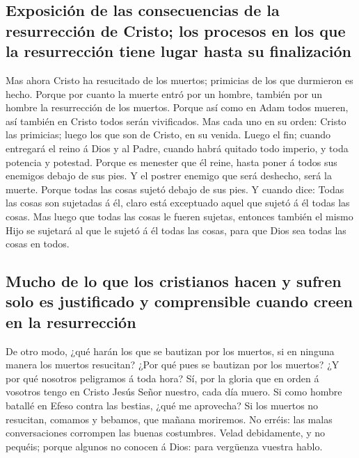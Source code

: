 \hypertarget{exposiciuxf3n-de-las-consecuencias-de-la-resurrecciuxf3n-de-cristo-los-procesos-en-los-que-la-resurrecciuxf3n-tiene-lugar-hasta-su-finalizaciuxf3n}{%
\subsection{Exposición de las consecuencias de la resurrección de
Cristo; los procesos en los que la resurrección tiene lugar hasta su
finalización}\label{exposiciuxf3n-de-las-consecuencias-de-la-resurrecciuxf3n-de-cristo-los-procesos-en-los-que-la-resurrecciuxf3n-tiene-lugar-hasta-su-finalizaciuxf3n}}

 Mas ahora Cristo ha resucitado de los muertos; primicias
de los que durmieron es hecho.  Porque por cuanto la
muerte entró por un hombre, también por un hombre la resurrección de los
muertos.  Porque así como en Adam todos mueren, así
también en Cristo todos serán vivificados.  Mas cada uno
en su orden: Cristo las primicias; luego los que son de Cristo, en su
venida.  Luego el fin; cuando entregará el reino á Dios y
al Padre, cuando habrá quitado todo imperio, y toda potencia y potestad.
 Porque es menester que él reine, hasta poner á todos sus
enemigos debajo de sus pies.  Y el postrer enemigo que
será deshecho, será la muerte.  Porque todas las cosas
sujetó debajo de sus pies. Y cuando dice: Todas las cosas son sujetadas
á él, claro está exceptuado aquel que sujetó á él todas las cosas.
 Mas luego que todas las cosas le fueren sujetas,
entonces también el mismo Hijo se sujetará al que le sujetó á él todas
las cosas, para que Dios sea todas las cosas en todos.

\hypertarget{mucho-de-lo-que-los-cristianos-hacen-y-sufren-solo-es-justificado-y-comprensible-cuando-creen-en-la-resurrecciuxf3n}{%
\subsection{Mucho de lo que los cristianos hacen y sufren solo es
justificado y comprensible cuando creen en la
resurrección}\label{mucho-de-lo-que-los-cristianos-hacen-y-sufren-solo-es-justificado-y-comprensible-cuando-creen-en-la-resurrecciuxf3n}}

 De otro modo, ¿qué harán los que se bautizan por los
muertos, si en ninguna manera los muertos resucitan? ¿Por qué pues se
bautizan por los muertos?  ¿Y por qué nosotros peligramos
á toda hora?  Sí, por la gloria que en orden á vosotros
tengo en Cristo Jesús Señor nuestro, cada día muero.  Si
como hombre batallé en Efeso contra las bestias, ¿qué me aprovecha? Si
los muertos no resucitan, comamos y bebamos, que mañana moriremos.
 No erréis: las malas conversaciones corrompen las buenas
costumbres.  Velad debidamente, y no pequéis; porque
algunos no conocen á Dios: para vergüenza vuestra hablo.

